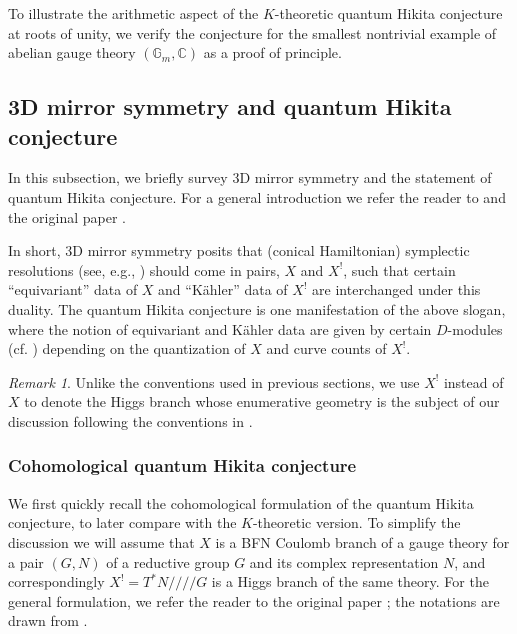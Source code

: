 \documentclass[reqno]{amsart}
\numberwithin{equation}{section}
\numberwithin{equation}{section}
\numberwithin{equation}{section}
\theoremstyle{definition}
\theoremstyle{remark}
\theoremstyle{remark}
\newtheorem{rem}[thm]{Remark}
\begin{document}
To illustrate the arithmetic aspect of the $K$-theoretic quantum Hikita conjecture at roots of unity, we verify the conjecture for the smallest nontrivial example of abelian gauge theory $(\mathbb{G}_m, \mathbb{C})$ as a proof of principle.

\subsection{3D mirror symmetry and quantum Hikita conjecture}\label{ssec:quantumHikita-introduction}
In this subsection, we briefly survey 3D mirror symmetry and the statement of quantum Hikita conjecture. For a general introduction we refer the reader to \cite{kamnitzer-survey} and the original paper \cite{KMP21}.

In short, 3D mirror symmetry posits that (conical Hamiltonian) symplectic resolutions (see, e.g., \cite[Section 2]{bai-lee}) should come in pairs, $X$ and $X^!$, such that certain ``equivariant'' data of $X$ and ``K\"ahler'' data of $X^!$ are interchanged under this duality. The quantum Hikita conjecture is one manifestation of the above slogan, where the notion of equivariant and K\"ahler data are given by certain $D$-modules (cf. \cite{KMP21}) depending on the quantization of $X$ and curve counts of $X^!$. 

\begin{rem}
    Unlike the conventions used in previous sections, we use $X^!$ instead of $X$ to denote the Higgs branch whose enumerative geometry is the subject of our discussion following the conventions in \cite{KMP21, bai-lee}.
\end{rem}

\subsubsection{Cohomological quantum Hikita conjecture}
We first quickly recall the cohomological formulation of the quantum Hikita conjecture, to later compare with the $K$-theoretic version. To simplify the discussion we will assume that $X$ is a BFN Coulomb branch \cite{BFN2} of a gauge theory for a pair $(G, N)$ of a reductive group $G$ and its complex representation $N$, and correspondingly $X^! = T^*N /\!\!/\!\!/\!\!/G$ is a Higgs branch of the same theory. For the general formulation, we refer the reader to the original paper \cite{KMP21}; the notations are drawn from \cite{bai-lee}.

\end{document}
